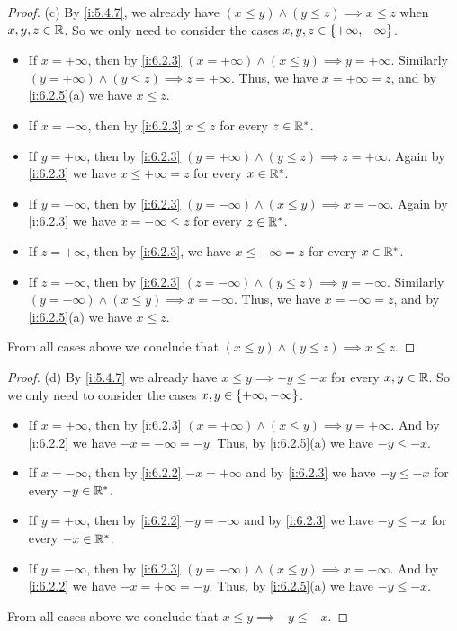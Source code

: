\begin{proof}{(c)}
  By \cref{i:5.4.7}, we already have \((x \leq y) \land (y \leq z) \implies x \leq z\) when \(x, y, z \in \mathbb{R}\).
  So we only need to consider the cases \(x, y, z \in \left\lbrace+\infty, -\infty\right\rbrace\).
  \begin{itemize}
    \item If \(x = +\infty\), then by \cref{i:6.2.3} \((x = +\infty) \land (x \leq y) \implies y = +\infty\).
          Similarly \((y = +\infty) \land (y \leq z) \implies z = +\infty\).
          Thus, we have \(x = +\infty = z\), and by \cref{i:6.2.5}(a) we have \(x \leq z\).
    \item If \(x = -\infty\), then by \cref{i:6.2.3} \(x \leq z \) for every \(z \in \mathbb{R}^*\).
    \item If \(y = +\infty\), then by \cref{i:6.2.3} \((y = +\infty) \land (y \leq z) \implies z = +\infty\).
          Again by \cref{i:6.2.3} we have \(x \leq +\infty = z\) for every \(x \in \mathbb{R}^*\).
    \item If \(y = -\infty\), then by \cref{i:6.2.3} \((y = -\infty) \land (x \leq y) \implies x = -\infty\).
          Again by \cref{i:6.2.3} we have \(x = -\infty \leq z\) for every \(z \in \mathbb{R}^*\).
    \item If \(z = +\infty\), then by \cref{i:6.2.3}, we have \(x \leq +\infty = z\) for every \(x \in \mathbb{R}^*\).
    \item If \(z = -\infty\), then by \cref{i:6.2.3} \((z = -\infty) \land (y \leq z) \implies y = -\infty\).
          Similarly \((y = -\infty) \land (x \leq y) \implies x = -\infty\).
          Thus, we have \(x = -\infty = z\), and by \cref{i:6.2.5}(a) we have \(x \leq z\).
  \end{itemize}
  From all cases above we conclude that \((x \leq y) \land (y \leq z) \implies x \leq z\).
\end{proof}

\begin{proof}{(d)}
  By \cref{i:5.4.7} we already have \(x \leq y \implies -y \leq -x\) for every \(x, y \in \mathbb{R}\).
  So we only need to consider the cases \(x, y \in \left\lbrace+\infty, -\infty\right\rbrace\).
  \begin{itemize}
    \item If \(x = +\infty\), then by \cref{i:6.2.3} \((x = +\infty) \land (x \leq y) \implies y = +\infty\).
          And by \cref{i:6.2.2} we have \(-x = -\infty = -y\).
          Thus, by \cref{i:6.2.5}(a) we have \(-y \leq -x\).
    \item If \(x = -\infty\), then by \cref{i:6.2.2} \(-x = +\infty\) and by \cref{i:6.2.3} we have \(-y \leq -x\) for every \(-y \in \mathbb{R}^*\).
    \item If \(y = +\infty\), then by \cref{i:6.2.2} \(-y = -\infty\) and by \cref{i:6.2.3} we have \(-y \leq -x\) for every \(-x \in \mathbb{R}^*\).
    \item If \(y = -\infty\), then by \cref{i:6.2.3} \((y = -\infty) \land (x \leq y) \implies x = -\infty\).
          And by \cref{i:6.2.2} we have \(-x = +\infty = -y\).
          Thus, by \cref{i:6.2.5}(a) we have \(-y \leq -x\).
  \end{itemize}
  From all cases above we conclude that \(x \leq y \implies -y \leq -x\).
\end{proof}

